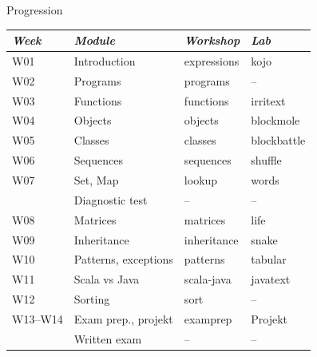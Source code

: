 \documentclass[aspectratio=169]{beamer}
\newenvironment{Slide}[1]%
  {\begin{frame}[environment=Slide]{#1}}
  {\end{frame}}%
\begin{document}
\begin{Slide}{Progression}
  \fontsize{7}{9}\selectfont
  \begin{tabular}{l|l|l|l}
    \textit{Week} & \textit{Module} & \textit{Workshop} & \textit{Lab} \\ \hline \hline
    W01 & Introduction & expressions & kojo \\
    W02 & Programs & programs & -- \\
    W03 & Functions & functions & irritext \\
    W04 & Objects & objects & blockmole \\
    W05 & Classes & classes & blockbattle \\
    W06 & Sequences & sequences & shuffle \\
    W07 & Set, Map & lookup & words \\
        & Diagnostic test & -- & -- \\
    W08 & Matrices & matrices & life \\
    W09 & Inheritance & inheritance & snake \\
    W10 & Patterns, exceptions & patterns & tabular \\
    W11 & Scala vs Java & scala-java & javatext \\
    W12 & Sorting & sort & -- \\
    W13--W14 & Exam prep., projekt & examprep & Projekt \\
        & Written exam & -- & -- \\
    \end{tabular}  
\end{Slide}
\end{document}
